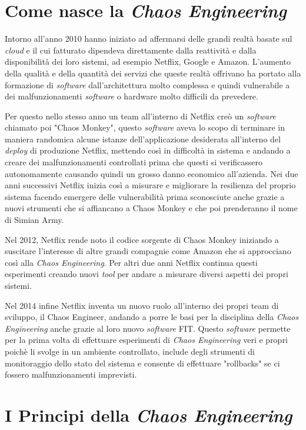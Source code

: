 \section{Come nasce la \textit{Chaos Engineering}}

Intorno all'anno 2010 hanno iniziato ad affermarsi delle grandi realtà basate sul \textit{cloud} e il cui fatturato dipendeva direttamente dalla reattività e dalla disponibilità dei loro sistemi, ad esempio Netflix, Google e Amazon.
L'aumento della qualità e della quantità dei servizi che queste realtà offrivano ha portato alla formazione di \textit{software} dall'architettura molto complessa e quindi vulnerabile a dei malfunzionamenti \textit{software} o hardware molto difficili da prevedere.

Per questo nello stesso anno un team all'interno di Netflix creò un \textit{software} chiamato poi "Chaos Monkey", questo \textit{software} aveva lo scopo di terminare in maniera randomica alcune istanze dell'applicazione desiderata all'interno del \textit{deploy} di produzione Netflix, mettendo così in difficoltà in sistema e andando a creare dei malfunzionamenti controllati prima che questi si verificassero autonomamente causando quindi un grosso danno economico all'azienda.
Nei due anni successivi Netflix inizia così a misurare e migliorare la resilienza del proprio sistema facendo emergere delle vulnerabilità prima sconosciute anche grazie a nuovi strumenti che si affiancano a Chaos Monkey e che poi prenderanno il nome di Simian Army.

Nel 2012, Netflix rende noto il codice sorgente di Chaos Monkey iniziando a suscitare l'interesse di altre grandi compagnie come Amazon che si approcciano così alla \textit{Chaos Engineering}.
Per altri due anni Netflix continua questi esperimenti creando nuovi \textit{tool} per andare a misurare diversi aspetti dei propri sistemi.

Nel 2014 infine Netflix inventa un nuovo ruolo all'interno dei propri team di sviluppo, il Chaos Engineer, andando a porre le basi per la disciplina della \textit{Chaos Engineering} anche grazie al loro nuovo \textit{software} FIT.
Questo \textit{software} permette per la prima volta di effettuare esperimenti di \textit{Chaos Engineering} veri e propri poichè li svolge in un ambiente controllato, include degli strumenti di monitoraggio dello stato del sistema e consente di effettuare "rollbacks" se ci fossero malfunzionamenti imprevisti.

\section{I Principi della \textit{Chaos Engineering}}

